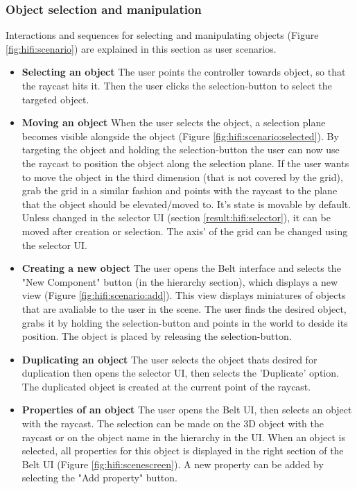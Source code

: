 \subsubsection{Object selection and manipulation}
Interactions and sequences for selecting and manipulating objects (Figure \ref{fig:hifi:scenario}) are explained in this section as user scenarios.
\begin{itemize}
  \item \textbf{Selecting an object} The user points the controller towards object, so that the raycast hits it. Then the user clicks the selection-button to select the targeted object.
  \item \textbf{Moving an object} When the user selects the object,  a selection plane becomes visible alongside the object (Figure \ref{fig:hifi:scenario:selected}). By targeting the object and holding the selection-button the user can now use the raycast to position the object along the selection plane. If the user wants to move the object in the third dimension (that is not covered by the grid), grab the grid in a similar fashion and points with the raycast to the plane that the object should be elevated/moved to. It's state is movable by default. Unless changed in the selector UI (section \ref{result:hifi:selector}), it can be moved after creation or selection. The axis' of the grid can be changed using the selector UI.
  \item \textbf{Creating a new object} The user opens the Belt interface and selects the "New Component" button (in the hierarchy section), which displays a new view (Figure \ref{fig:hifi:scenario:add}). This view displays miniatures of objects that are avaliable to the user in the scene. The user finds the desired object, grabs it by holding the selection-button and points in the world to deside its position. The object is placed by releasing the selection-button.
  \item \textbf{Duplicating an object} The user selects the object thats desired for duplication then opens the selector UI, then selects the 'Duplicate' option. The duplicated object is created at the current point of the raycast.
  \item \textbf{Properties of an object} The user opens the Belt UI, then selects an object with the raycast. The selection can be made on the 3D object with the raycast or on the object name in the hierarchy in the UI. When an object is selected, all properties for this object is displayed in the right section of the Belt UI (Figure \ref{fig:hifi:scenescreen}). A new property can be added by selecting the "Add property" button.
\end{itemize}

